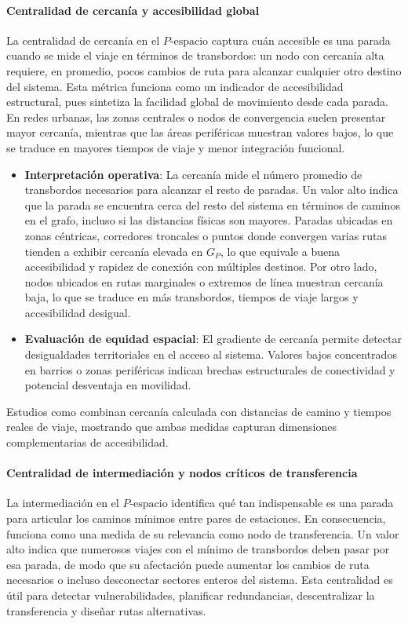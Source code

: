             \paragraph{Centralidad de cercanía y accesibilidad global}
            La centralidad de cercanía en el $P\text{-espacio}$ captura cuán accesible es una parada cuando se mide el viaje en términos de transbordos: un nodo con cercanía alta requiere, en promedio, pocos cambios de ruta para alcanzar cualquier otro destino del sistema. Esta métrica funciona como un indicador de accesibilidad estructural, pues sintetiza la facilidad global de movimiento desde cada parada. En redes urbanas, las zonas centrales o nodos de convergencia suelen presentar mayor cercanía, mientras que las áreas periféricas muestran valores bajos, lo que se traduce en mayores tiempos de viaje y menor integración funcional.

            \begin{itemize}
                \item \textbf{Interpretación operativa}: La cercanía mide el número promedio de transbordos necesarios para alcanzar el resto de paradas. Un valor alto indica que la parada se encuentra cerca del resto del sistema en términos de caminos en el grafo, incluso si las distancias físicas son mayores. Paradas ubicadas en zonas céntricas, corredores troncales o puntos donde convergen varias rutas tienden a exhibir cercanía elevada en $G_P$, lo que equivale a buena accesibilidad y rapidez de conexión con múltiples destinos. Por otro lado, nodos ubicados en rutas marginales o extremos de línea muestran cercanía baja, lo que se traduce en más transbordos, tiempos de viaje largos y accesibilidad desigual.

                \item \textbf{Evaluación de equidad espacial}: El gradiente de cercanía permite detectar desigualdades territoriales en el acceso al sistema. Valores bajos concentrados en barrios o zonas periféricas indican brechas estructurales de conectividad y potencial desventaja en movilidad.
            \end{itemize}

            Estudios como \cite{dingluo2019} combinan cercanía calculada con distancias de camino y tiempos reales de viaje, mostrando que ambas medidas capturan dimensiones complementarias de accesibilidad.

            \paragraph{Centralidad de intermediación y nodos críticos de transferencia}
            La intermediación en el $P\text{-espacio}$ identifica qué tan indispensable es una parada para articular los caminos mínimos entre pares de estaciones. En consecuencia, funciona como una medida de su relevancia como nodo de transferencia. Un valor alto indica que numerosos viajes con el mínimo de transbordos deben pasar por esa parada, de modo que su afectación puede aumentar los cambios de ruta necesarios o incluso desconectar sectores enteros del sistema. Esta centralidad es útil para detectar vulnerabilidades, planificar redundancias, descentralizar la transferencia y diseñar rutas alternativas.



